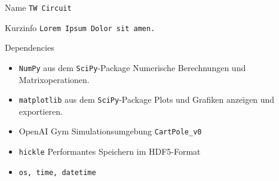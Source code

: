 \begin{minipage}[t]{0.65\textwidth}
	\begin{mybox}{Name}
		\texttt{TW Circuit}
	\end{mybox}
	\begin{mybox}{Kurzinfo}
		\texttt{Lorem Ipsum Dolor sit amen.}
	\end{mybox}
	\begin{mybox}{Dependencies}
		\begin{itemize}
			\item \texttt{NumPy} aus dem \texttt{SciPy}-Package
			\subitem Numerische Berechnungen und Matrixoperationen.
			\item \texttt{matplotlib} aus dem \texttt{SciPy}-Package
			\subitem Plots und Grafiken anzeigen und exportieren.
			\item OpenAI Gym
			\subitem Simulationsumgebung \texttt{CartPole\_v0}
			\item \texttt{hickle}
			\subitem Performantes Speichern im HDF5-Format
			\item \texttt{os, time, datetime}
		\end{itemize}
	\end{mybox}
\end{minipage}
\hfill
